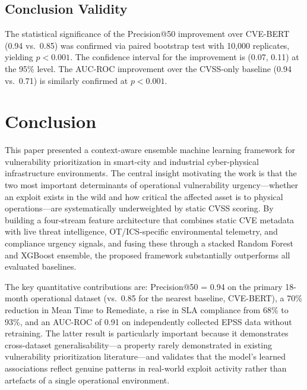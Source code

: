 \documentclass[review,12pt]{elsarticle}
\begin{document}
\subsection{Conclusion Validity}

The statistical significance of the Precision@50 improvement over CVE-BERT (0.94 vs.\ 0.85) was confirmed via paired bootstrap test with 10,000 replicates, yielding $p < 0.001$. The confidence interval for the improvement is (0.07, 0.11) at the 95\% level. The AUC-ROC improvement over the CVSS-only baseline (0.94 vs.\ 0.71) is similarly confirmed at $p < 0.001$.

\section{Conclusion}
\label{sec:conclusion}

This paper presented a context-aware ensemble machine learning framework for vulnerability prioritization in smart-city and industrial cyber-physical infrastructure environments. The central insight motivating the work is that the two most important determinants of operational vulnerability urgency---whether an exploit exists in the wild and how critical the affected asset is to physical operations---are systematically underweighted by static CVSS scoring. By building a four-stream feature architecture that combines static CVE metadata with live threat intelligence, OT/ICS-specific environmental telemetry, and compliance urgency signals, and fusing these through a stacked Random Forest and XGBoost ensemble, the proposed framework substantially outperforms all evaluated baselines.

The key quantitative contributions are: Precision@50 = 0.94 on the primary 18-month operational dataset (vs.\ 0.85 for the nearest baseline, CVE-BERT), a 70\% reduction in Mean Time to Remediate, a rise in SLA compliance from 68\% to 93\%, and an AUC-ROC of 0.91 on independently collected EPSS data without retraining. The latter result is particularly important because it demonstrates cross-dataset generalisability---a property rarely demonstrated in existing vulnerability prioritization literature---and validates that the model's learned associations reflect genuine patterns in real-world exploit activity rather than artefacts of a single operational environment.
\end{document}
